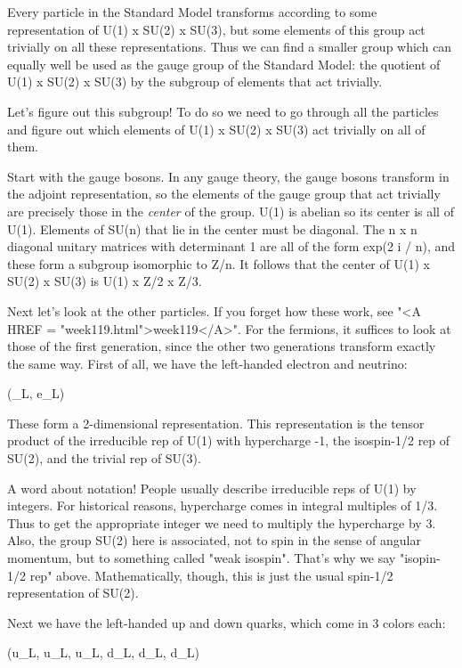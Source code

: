 Every particle in the Standard Model transforms according to some
representation of U(1) x SU(2) x SU(3), but some elements of this
group act trivially on all these representations.  Thus we can find
a smaller group which can equally well be used as the gauge group 
of the Standard Model: the quotient of U(1) x SU(2) x SU(3) 
by the subgroup of elements that act trivially.

Let's figure out this subgroup!  To do so we need to go through all
the particles and figure out which elements of U(1) x SU(2) x SU(3) 
act trivially on all of them.  

Start with the gauge bosons.  In any gauge theory, the gauge bosons
transform in the adjoint representation, so the elements of the gauge
group that act trivially are precisely those in the \emph{center} of the 
group.  U(1) is abelian so its center is all of U(1).  Elements of SU(n)
that lie in the center must be diagonal.  The n x n diagonal unitary 
matrices with determinant 1 are all of the form exp(2 \pi  i / n), 
and these form a subgroup isomorphic to Z/n.  It follows that the
center of U(1) x SU(2) x SU(3) is U(1) x Z/2 x Z/3.   

Next let's look at the other particles.  If you forget how these work,
see "<A HREF = "week119.html">week119</A>".  For the fermions, it suffices to look at those of the
first generation, since the other two generations transform exactly
the same way.  First of all, we have the left-handed electron and
neutrino:

(\nu _L, e_L)                                

These form a 2-dimensional representation.  This representation is the
tensor product of the irreducible rep of U(1) with hypercharge -1, the
isospin-1/2 rep of SU(2), and the trivial rep of SU(3).   

A word about notation!  People usually describe irreducible reps of U(1)
by integers.  For historical reasons, hypercharge comes in integral
multiples of 1/3.  Thus to get the appropriate integer we need to 
multiply the hypercharge by 3.  Also, the group SU(2) here is
associated, not to spin in the sense of angular momentum, but to
something called "weak isospin".  That's why we say "isopin-1/2 rep"
above.  Mathematically, though, this is just the usual spin-1/2
representation of SU(2).   

Next we have the left-handed up and down quarks, which come in 3
colors each:

(u_L, u_L, u_L, d_L, d_L, d_L)              

